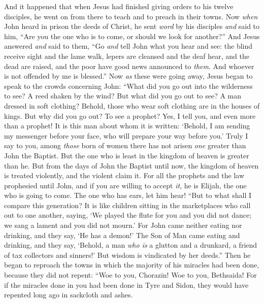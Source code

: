 \begin{biblechapter} %
 And it happened that when Jesus had finished giving orders to his twelve disciples, he went on from there to teach and to preach in their towns.
\verse Now \textit{when} John heard in prison the deeds of Christ, he sent \textit{word} by his disciples
\verse \textit{and} said to him, “Are you the one who is to come, or should we look for another?”
\verse And Jesus answered \textit{and} said to them, “Go \textit{and} tell John what you hear and see:
\verse the blind receive sight and the lame walk, lepers are cleansed and the deaf hear, and the dead are raised, and the poor have good news announced to \textit{them}.
\verse And whoever is not offended by me is blessed.”
\verse Now \textit{as} these were going away, Jesus began to speak to the crowds concerning John: “What did you go out into the wilderness to see? A reed shaken by the wind?
\verse But what did you go out to see? A man dressed in soft clothing? Behold, those who wear soft clothing are in the houses of kings.
\verse But why did you go out? To see a prophet? Yes, I tell you, and even more than a prophet!
\verse It is this man about whom it is written: ‘Behold, I am sending my messenger before your face, 
who will prepare your way before you.’
\verse Truly I say to you, among \textit{those} born of women there has not arisen \textit{one} greater than John the Baptist. But the one who is least in the kingdom of heaven is greater than he.
\verse But from the days of John the Baptist until now, the kingdom of heaven is treated violently, and the violent claim it.
\verse For all the prophets and the law prophesied until John,
\verse and if you are willing to accept \textit{it}, he is Elijah, the one who is going to come.
\verse The one who has ears, let him hear!
\verse “But to what shall I compare this generation? It is like children sitting in the marketplaces who call out to one another,
\verse saying, ‘We played the flute for you and you did not dance; 
we sang a lament and you did not mourn.’
\verse For John came neither eating nor drinking, and they say, ‘He has a demon!’
\verse The Son of Man came eating and drinking, and they say, ‘Behold, a man \textit{who is} a glutton and a drunkard, a friend of tax collectors and sinners!’ But wisdom is vindicated by her deeds.”
 Then he began to reproach the towns in which the majority of his miracles had been done, because they did not repent:
\verse “Woe to you, Chorazin! Woe to you, Bethsaida! For if the miracles done in you had been done in Tyre and Sidon, they would have repented long ago in sackcloth and ashes.

\end{biblechapter}
